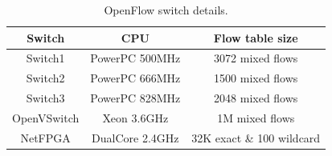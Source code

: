 \begin{table}[h!]
  \begin{center}
{\small
  \begin{tabular}{ |c | c | c | }
    \hline                        
    \textbf{Switch} & \textbf{CPU} & \textbf{Flow table size} \\
    \hline  
    Switch1 & PowerPC 500MHz & 3072 mixed flows \\
    \hline  
    Switch2 & PowerPC 666MHz & 1500 mixed flows \\
    \hline  
    Switch3 & PowerPC 828MHz & 2048 mixed flows \\
    \hline  
    OpenVSwitch & Xeon 3.6GHz & 1M mixed flows \\
    \hline  
    NetFPGA &  DualCore 2.4GHz & 32K exact \& 100 wildcard \\
    \hline 
  \end{tabular}  

}
\end{center}
\caption{OpenFlow switch details.}
\label{tbl:switch_list}
\end{table}


